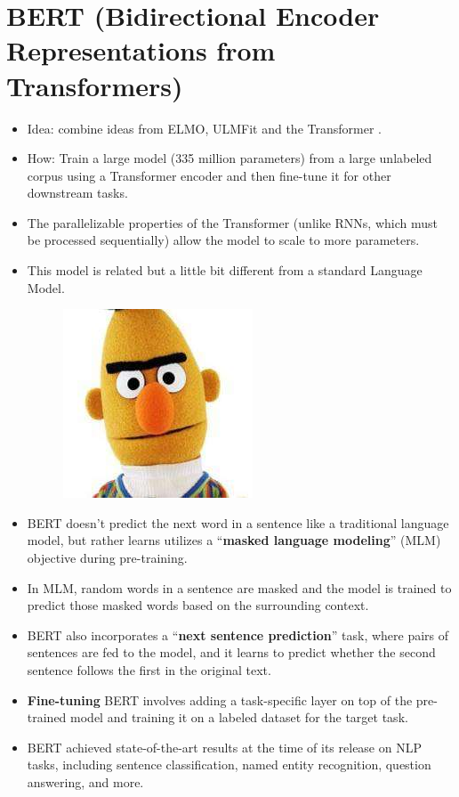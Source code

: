 \section{BERT (Bidirectional Encoder Representations from Transformers)}
\begin{itemize}
\item Idea: combine ideas from ELMO, ULMFit and the Transformer \cite{kenton2019bert}.
\item How: Train a large model (335 million parameters) from a large unlabeled corpus using a Transformer encoder and then fine-tune it for other downstream tasks.
\item The parallelizable properties of the Transformer (unlike RNNs, which must be processed sequentially) allow the model to scale to more parameters.
\item This model is related but a little bit different from a standard Language Model.

     \begin{figure}[h]
        	\includegraphics[scale = 0.4]{pics/bert.png}
        \end{figure}  
\item BERT  doesn't predict the next word in a sentence like a traditional language model, but rather learns utilizes a ``\textbf{masked language modeling}'' (MLM) objective during pre-training.

\item In MLM, random words in a sentence are masked and the model is trained to predict those masked words based on the surrounding context.
\item BERT also incorporates a ``\textbf{next sentence prediction}'' task, where pairs of sentences are fed to the model, and it learns to predict whether the second sentence follows the first in the original text.
\item \textbf{Fine-tuning} BERT involves adding a task-specific layer on top of the pre-trained model and training it on a labeled dataset for the target task.
\item BERT achieved state-of-the-art results at the time of its release on NLP tasks, including sentence classification, named entity recognition, question answering, and more.





\end{itemize}


